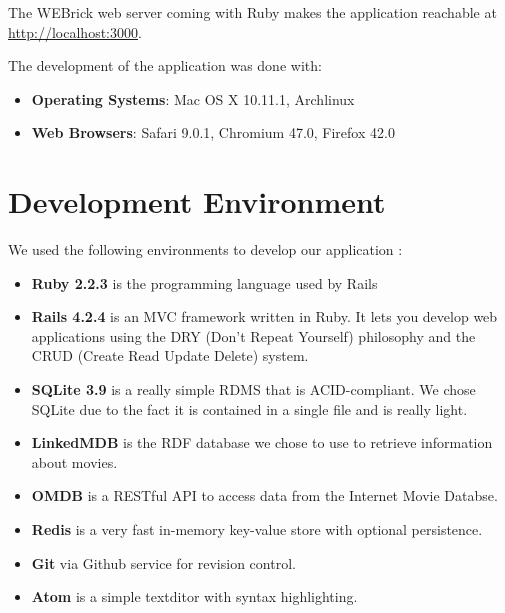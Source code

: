 \documentclass[12pt,a4paper]{article}
\begin{document}
The WEBrick web server coming with Ruby makes the application reachable at \url{http://localhost:3000}.

The development of the application was done with:
\begin{itemize}
\item \textbf{Operating Systems}: Mac OS X 10.11.1, Archlinux
\item \textbf{Web Browsers}: Safari 9.0.1, Chromium 47.0, Firefox 42.0
\end{itemize}



\section{Development Environment}\label{dev_plat}

We used the following environments to develop our application :

\begin{itemize}
\item \textbf{Ruby 2.2.3} is the programming language used by Rails
\item \textbf{Rails 4.2.4} is an MVC framework written in Ruby. It lets you develop web applications using the DRY (Don't Repeat Yourself) philosophy and the CRUD (Create Read Update Delete) system.

\item \textbf{SQLite 3.9} is a really simple RDMS that is ACID-compliant. We chose SQLite due to the fact it is contained in a single file and is really light.
\item \textbf{LinkedMDB} is the RDF database we chose to use to retrieve information about movies.
\item \textbf{OMDB} is a RESTful API to access data from the Internet Movie Databse.
\item \textbf{Redis} is a very fast in-memory key-value store with optional persistence.
\item \textbf{Git} via Github service for revision control.
\item \textbf{Atom} is a simple textditor with syntax highlighting.
\end{itemize}


\end{document}
